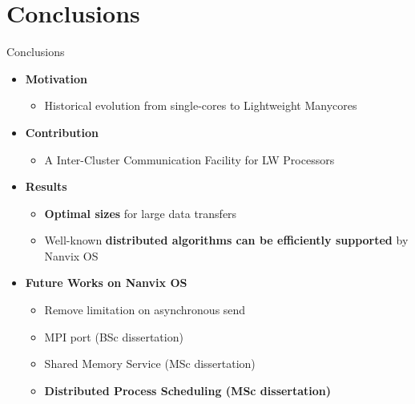 \section{Conclusions}

	\begin{frame}[fragile]{Conclusions}
		\begin{itemize}
			\item \textbf{Motivation}
			\begin{itemize}
				\item Historical evolution from single-cores to Lightweight Manycores
			\end{itemize}
		\end{itemize}

		\begin{itemize}
			\item \textbf{Contribution}
			\begin{itemize}
				\item A Inter-Cluster Communication Facility for LW Processors
			\end{itemize}
		\end{itemize}

		\begin{itemize}
			\item \textbf{Results}
			\begin{itemize}
				\item \textbf{Optimal sizes} for large data transfers
				\item Well-known \textbf{distributed algorithms can be efficiently supported} by Nanvix OS
			\end{itemize}
		\end{itemize}


		\begin{itemize}
			\item \textbf{Future Works on Nanvix OS}
			\begin{itemize}
				\item Remove limitation on asynchronous send
				\item MPI port (BSc dissertation)
				\item Shared Memory Service (MSc dissertation)
				\item \textbf{Distributed Process Scheduling (MSc dissertation)}
			\end{itemize}
		\end{itemize}

		
	\end{frame}

